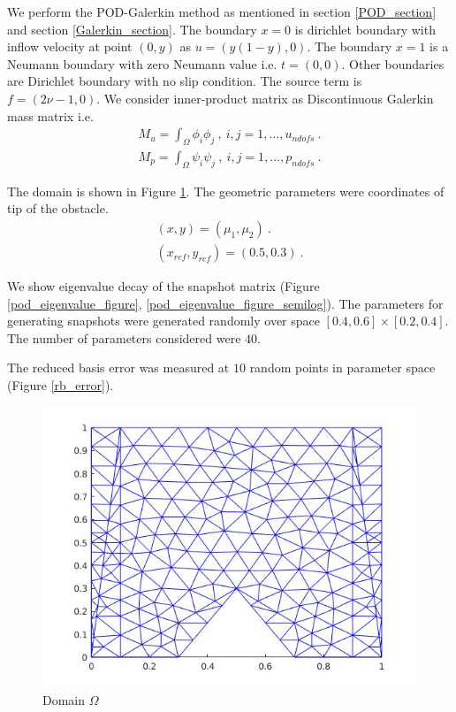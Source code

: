 \documentclass[a4paper,oneside,openright,spanish,english]{book}
\begin{document}
We perform the POD-Galerkin method as mentioned in section \ref{POD_section} and section \ref{Galerkin_section}. The boundary ${x=0}$ is dirichlet boundary with inflow velocity at point $(0,y)$ as $u = (y(1-y), 0)$. The boundary ${x = 1}$ is a Neumann boundary with zero Neumann value i.e. $t = (0, 0)$. Other boundaries are Dirichlet boundary with no slip condition. The source term is $f = (2 \nu - 1, 0)$. We consider inner-product matrix as Discontinuous Galerkin mass matrix i.e.
\begin{gather}
M_u = \int_{\Omega} \phi_i \phi_j \ , \ i,j = 1, \ldots, u_{ndofs} \ . \\
M_p = \int_{\Omega} \psi_i \psi_j \ , \ i,j = 1, \ldots, p_{ndofs} \ .
\end{gather}

The domain is shown in Figure \ref{pod_figure}. The geometric parameters were coordinates of tip of the obstacle.
\begin{gather}
(x,y) = (\mu_1,\mu_2) \ . \\
(x_{ref},y_{ref}) = (0.5,0.3) \ .
\end{gather}

We show eigenvalue decay of the snapshot matrix (Figure \ref{pod_eigenvalue_figure}, \ref{pod_eigenvalue_figure_semilog}). The parameters for generating snapshots were generated randomly over space $[0.4,0.6] \times [0.2,0.4]$. The number of parameters considered were $40$. 

The reduced basis error was measured at $10$ random points in parameter space (Figure \ref{rb_error}).

\begin{figure}
  \includegraphics[width=\linewidth]{pod_figure.jpg}
  \caption{Domain $\Omega$} 
  \label{pod_figure}
\end{figure}
\end{document}
